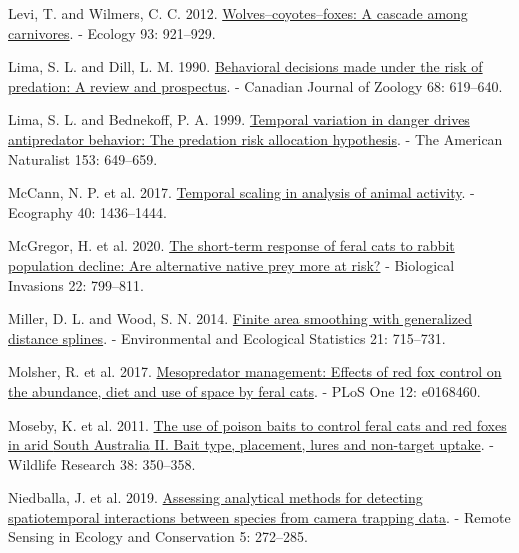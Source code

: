 \documentclass[preprint, 3p, authoryear]{elsarticle} %
\newlength{\cslhangindent}
\newlength{\cslentryspacingunit} %
\newenvironment{CSLReferences}[2] %
 {%
  \setlength{\parindent}{0pt}
  \ifodd #1
  \let\oldpar\par
  \def\par{\hangindent=\cslhangindent\oldpar}
  \fi
  \setlength{\parskip}{#2\cslentryspacingunit}
 }%
 {}
\begin{document}
\begin{CSLReferences}{1}{0}
\leavevmode{}%
Levi, T. and Wilmers, C. C. 2012. \href{https://doi.org/10.1890/11-0165.1}{Wolves--coyotes--foxes: A cascade among carnivores}. - Ecology 93: 921--929.

\leavevmode{}%
Lima, S. L. and Dill, L. M. 1990. \href{https://doi.org/10.1139/z90-092}{Behavioral decisions made under the risk of predation: A review and prospectus}. - Canadian Journal of Zoology 68: 619--640.

\leavevmode{}%
Lima, S. L. and Bednekoff, P. A. 1999. \href{https://doi.org/10.1086/303202}{Temporal variation in danger drives antipredator behavior: The predation risk allocation hypothesis}. - The American Naturalist 153: 649--659.

\leavevmode{}%
McCann, N. P. et al. 2017. \href{https://doi.org/10.1111/ecog.02742}{Temporal scaling in analysis of animal activity}. - Ecography 40: 1436--1444.

\leavevmode{}%
McGregor, H. et al. 2020. \href{https://doi.org/10.1007/s10530-019-02131-5}{The short-term response of feral cats to rabbit population decline: Are alternative native prey more at risk?} - Biological Invasions 22: 799--811.

\leavevmode{}%
Miller, D. L. and Wood, S. N. 2014. \href{https://doi.org/10.1007/s10651-014-0277-4}{Finite area smoothing with generalized distance splines}. - Environmental and Ecological Statistics 21: 715--731.

\leavevmode{}%
Molsher, R. et al. 2017. \href{https://doi.org/10.1371/journal.pone.0168460}{Mesopredator management: Effects of red fox control on the abundance, diet and use of space by feral cats}. - PLoS One 12: e0168460.

\leavevmode{}%
Moseby, K. et al. 2011. \href{https://doi.org/10.1071/WR10236}{The use of poison baits to control feral cats and red foxes in arid {South Australia} II. Bait type, placement, lures and non-target uptake}. - Wildlife Research 38: 350--358.

\leavevmode{}%
Niedballa, J. et al. 2019. \href{https://doi.org/10.1002/rse2.107}{Assessing analytical methods for detecting spatiotemporal interactions between species from camera trapping data}. - Remote Sensing in Ecology and Conservation 5: 272--285.


\end{CSLReferences}
\end{document}
